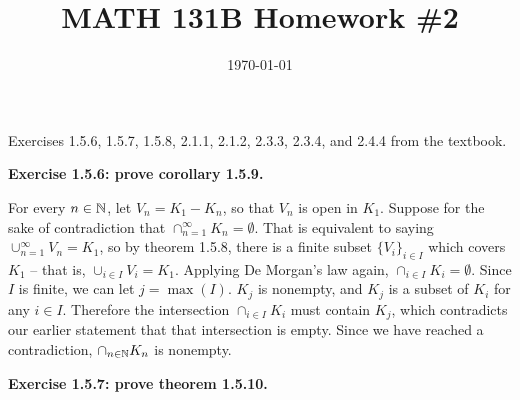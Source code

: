 \documentclass{article}
\date{\today}
\title{MATH 131B Homework \#2}
\begin{document}
\maketitle

\begin{prob}
    Exercises 1.5.6, 1.5.7, 1.5.8, 2.1.1, 2.1.2, 2.3.3, 2.3.4, and 2.4.4 from the textbook.
\end{prob}
\textbf{Exercise 1.5.6: prove corollary 1.5.9.}
\par
For every $n \in \mathbb{N}$, let $V_n = K_1 - K_n$, so that $V_n$ is open in $K_1$. Suppose for the sake of contradiction that $\cap_{n=1}^\infty K_n = \emptyset$. That is equivalent to saying $\cup_{n=1}^\infty V_n = K_1$, so by theorem 1.5.8, there is a finite subset $\{ V_i \}_{i \in I}$ which covers $K_1$ -- that is, $\cup_{i\in I} V_i = K_1$. Applying De Morgan's law again, $\cap_{i \in I} K_i = \emptyset$. Since $I$ is finite, we can let $j = \max(I)$. $K_j$ is nonempty, and $K_j$ is a subset of $K_i$ for any $i \in I$. Therefore the intersection $\cap_{i \in I} K_i$ must contain $K_j$, which contradicts our earlier statement that that intersection is empty. Since we have reached a contradiction, $\cap_{n \in \mathbb{N}} K_n$ is nonempty.
\bigskip
\par
\textbf{Exercise 1.5.7: prove theorem 1.5.10.}
\end{document}
